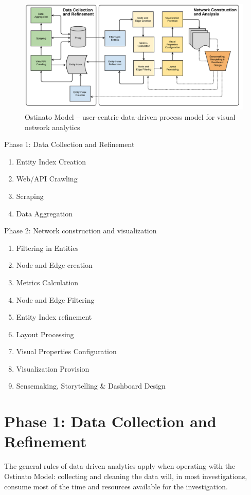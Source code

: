 \begin{figure}[htb]
\centering
\includegraphics[width=12cm]{diagram/kredible_net_process_model-v07.png}
\caption{Ostinato Model – user-centric data-driven process model for visual network analytics}
\label{fig:ostinato}
\end{figure}

Phase 1: Data Collection and Refinement

\begin{enumerate}
\item Entity Index Creation
\item Web/API Crawling
\item Scraping
\item Data Aggregation
\end{enumerate}

Phase 2: Network construction and visualization

\begin{enumerate}
\item Filtering in Entities 
\item Node and Edge creation
\item Metrics Calculation
\item Node and Edge Filtering
\item Entity Index refinement
\item Layout Processing
\item Visual Properties Configuration
\item Visualization Provision
\item Sensemaking, Storytelling \& Dashboard Design
\end{enumerate}

\section{Phase 1: Data Collection and Refinement}
\label{subsec:modelphase1}

The general rules of data-driven analytics apply when operating with the Ostinato Model: collecting and cleaning the data will, in most investigations, consume most of the time and resources available for the investigation.

